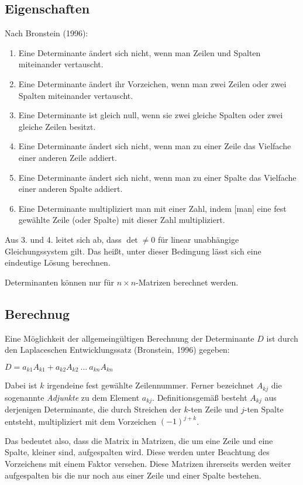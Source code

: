 \documentclass[11pt,a4paper]{article}
\begin{document}
\subsection{Eigenschaften}
Nach Bronstein (1996):
\begin{enumerate}
	\item Eine Determinante ändert sich nicht, wenn man Zeilen und Spalten miteinander vertauscht.
	\item Eine Determinante ändert ihr Vorzeichen, wenn man zwei Zeilen oder zwei Spalten miteinander vertauscht.
	\item Eine Determinante ist gleich null, wenn sie zwei gleiche Spalten oder zwei gleiche Zeilen besitzt.
	\item Eine Determinante ändert sich nicht, wenn man zu einer Zeile das Vielfache einer anderen Zeile addiert.
	\item Eine Determinante ändert sich nicht, wenn man zu einer Spalte das Vielfache einer anderen Spalte addiert.
	\item Eine Determinante multipliziert man mit einer Zahl, indem [man] eine fest gewählte Zeile (oder Spalte) mit dieser Zahl multipliziert.
\end{enumerate}

Aus 3. und 4. leitet sich ab, dass $\det \neq 0$ für linear unabhängige Gleichungssystem gilt. Das heißt, unter dieser Bedingung lässt sich eine eindeutige Lösung berechnen.

Determinanten können nur für $n \times n$-Matrizen berechnet werden.

\subsection{Berechnug}
Eine Möglichkeit der allgemeingültigen Berechnung der Determinante $D$ ist durch den Laplaceschen Entwicklungssatz (Bronstein, 1996) gegeben:

$D = a_{k1} A_{k1} + a_{k2} A_{k2} ~...~ a_{kn} A_{kn}$

Dabei ist $k$ irgendeine fest gewählte Zeilennummer. Ferner bezeichnet $A_{kj}$ die sogenannte \textit{Adjunkte} zu dem Element $a_{kj}$. Definitionsgemäß besteht $A_{kj}$ aus derjenigen Determinante, die durch Streichen der $k$-ten Zeile und $j$-ten Spalte entsteht, multipliziert mit dem Vorzeichen $(-1)^{j+k}$.

Das bedeutet also, dass die Matrix in Matrizen, die um eine Zeile und eine Spalte, kleiner sind, aufgespalten wird. Diese werden unter Beachtung des Vorzeichens mit einem Faktor versehen. Diese Matrizen ihrerseits werden weiter aufgespalten bis die nur noch aus einer Zeile und einer Spalte bestehen.
\end{document}
